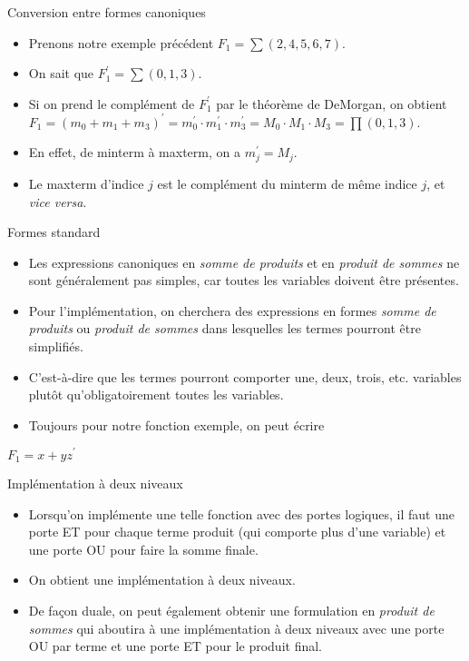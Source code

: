 \documentclass[presentation]{beamer}
\begin{document}
\begin{frame}[label={sec:orgd0eb907}]{Conversion entre formes canoniques}
\begin{itemize}
\item Prenons notre exemple précédent \(F_1 = \sum (2, 4, 5, 6, 7)\).

\item On sait que \(F_1^\prime = \sum (0,1,3)\).

\item Si on prend le complément de \(F_1^\prime\) par le théorème de DeMorgan, on obtient \(F_1 = (m_0 + m_1 + m_3)^\prime = m_0^\prime \cdot m_1^\prime \cdot m_3^\prime = M_0 \cdot M_1 \cdot M_3 = \prod (0,1,3)\).

\item En effet, de minterm à maxterm, on a \(m_j^\prime = M_j\).

\item Le maxterm d'indice \(j\) est le complément du minterm de même indice \(j\), et \emph{vice versa}.
\end{itemize}
\end{frame}

\begin{frame}[label={sec:orgd0ef21c}]{Formes standard}
\begin{itemize}
\item Les expressions canoniques en \emph{somme de produits} et en \emph{produit de sommes} ne sont généralement pas simples, car toutes les variables doivent être présentes.

\item Pour l'implémentation, on cherchera des expressions en formes \emph{somme de produits} ou \emph{produit de sommes} dans lesquelles les termes pourront être simplifiés.

\item C'est-à-dire que les termes pourront comporter une, deux, trois, etc. variables plutôt qu'obligatoirement \alert{toutes} les variables.

\item Toujours pour notre fonction exemple, on peut écrire
\end{itemize}

\(F_1 = x + y z^\prime\)
\end{frame}

\begin{frame}[label={sec:org6b424df}]{Implémentation à deux niveaux}
\begin{itemize}
\item Lorsqu'on implémente une telle fonction avec des portes logiques, il faut une porte ET pour chaque terme produit (qui comporte plus d'une variable) et une porte OU pour faire la somme finale.

\item On obtient une implémentation à deux niveaux.

\item De façon duale, on peut également obtenir une formulation en \emph{produit de sommes} qui aboutira à une implémentation à deux niveaux avec une porte OU par terme et une porte ET pour le produit final.
\end{itemize}
\end{frame}
\end{document}
